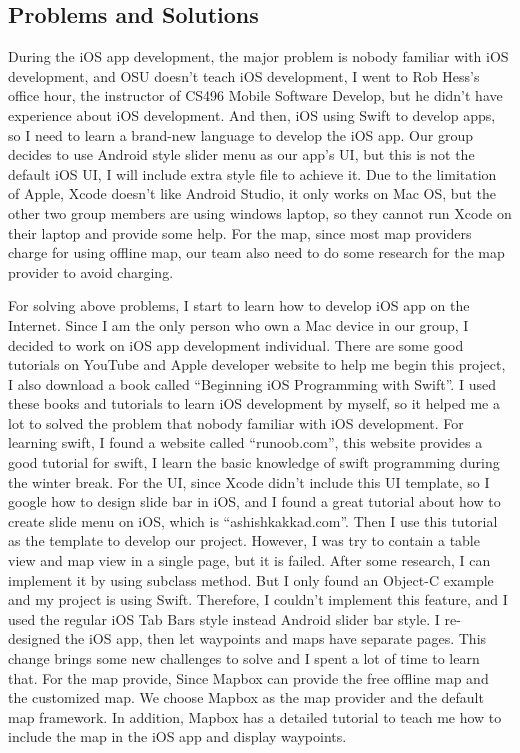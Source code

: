 \documentclass[letterpaper, 10pt,titlepage]{article}
\begin{document}
\subsection{Problems and Solutions}
During the iOS app development, the major problem is nobody familiar with iOS development, and OSU doesn’t teach iOS development, I went to Rob Hess’s office hour, the instructor of CS496 Mobile Software Develop, but he didn’t have experience about iOS development. And then, iOS using Swift to develop apps, so I need to learn a brand-new language to develop the iOS app. Our group decides to use Android style slider menu as our app’s UI, but this is not the default iOS UI, I will include extra style file to achieve it. Due to the limitation of Apple, Xcode doesn’t like Android Studio, it only works on Mac OS, but the other two group members are using windows laptop, so they cannot run Xcode on their laptop and provide some help. For the map, since most map providers charge for using offline map, our team also need to do some research for the map provider to avoid charging. 

For solving above problems, I start to learn how to develop iOS app on the Internet. Since I am the only person who own a Mac device in our group, I decided to work on iOS app development individual. There are some good tutorials on YouTube and Apple developer website to help me begin this project, I also download a book called “Beginning iOS Programming with Swift”. I used these books and tutorials to learn iOS development by myself, so it helped me a lot to solved the problem that nobody familiar with iOS development. For learning swift, I found a website called “runoob.com”, this website provides a good tutorial for swift, I learn the basic knowledge of swift programming during the winter break. For the UI, since Xcode didn’t include this UI template, so I google how to design slide bar in iOS, and I found a great tutorial about how to create slide menu on iOS, which is “ashishkakkad.com”. Then I use this tutorial as the template to develop our project. However, I was try to contain a table view and map view in a single page, but it is failed. After some research, I can implement it by using subclass method. But I only found an Object-C example and my project is using Swift. Therefore, I couldn’t implement this feature, and I used the regular iOS Tab Bars style instead Android slider bar style. I re-designed the iOS app, then let waypoints and maps have separate pages. This change brings some new challenges to solve and I spent a lot of time to learn that. For the map provide, Since Mapbox can provide the free offline map and the customized map. We choose Mapbox as the map provider and the default map framework. In addition, Mapbox has a detailed tutorial to teach me how to include the map in the iOS app and display waypoints.
\end{document}
